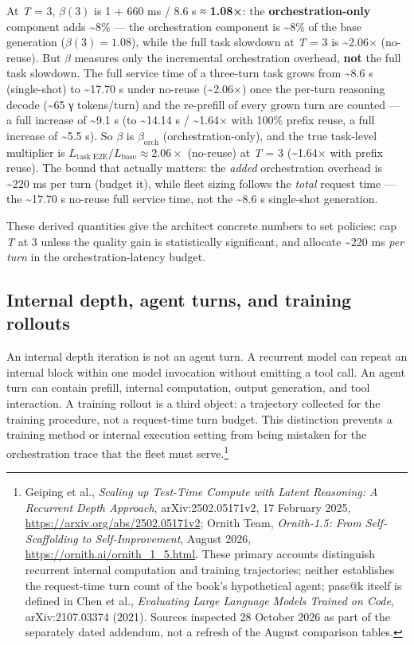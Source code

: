 At \emph{T} = 3, \(\beta(3)\) is 1 + 660 ms / 8.6 s ≈ \textbf{1.08×}:
the \textbf{orchestration-only} component adds \textasciitilde8\% ---
the orchestration component is \textasciitilde8\% of the base generation
(\(\beta(3) = 1.08\)), while the full task slowdown at \emph{T} = 3 is
\textasciitilde2.06× (no-reuse). But \(\beta\) measures only the
incremental orchestration overhead, \textbf{not} the full task slowdown.
The full service time of a three-turn task grows from \textasciitilde8.6
s (single-shot) to \textasciitilde17.70 s under no-reuse
(\textasciitilde2.06×) once the per-turn reasoning decode
(\textasciitilde65 γ tokens/turn) and the re-prefill of every grown turn
are counted --- a full increase of \textasciitilde9.1 s (to
\textasciitilde14.14 s / \textasciitilde1.64× with 100\% prefix reuse, a
full increase of \textasciitilde5.5 s). So \(\beta\) is
\(\beta_\text{orch}\) (orchestration-only), and the true task-level
multiplier is \(L_\text{task E2E}/L_\text{base} \approx 2.06×\)
(no-reuse) at \emph{T} = 3 (\textasciitilde1.64× with prefix reuse). The
bound that actually matters: the \emph{added} orchestration overhead is
\textasciitilde220 ms per turn (budget it), while fleet sizing follows
the \emph{total} request time --- the \textasciitilde17.70 s no-reuse
full service time, not the \textasciitilde8.6 s single-shot generation.

These derived quantities give the architect concrete numbers to set
policies: cap \emph{T} at 3 unless the quality gain is statistically
significant, and allocate \textasciitilde220 ms \emph{per turn} in the
orchestration-latency budget.

\subsection{Internal depth, agent turns, and training
rollouts}\label{internal-depth-agent-turns-and-training-rollouts}

An internal depth iteration is not an agent turn. A recurrent model can
repeat an internal block within one model invocation without emitting a
tool call. An agent turn can contain prefill, internal computation,
output generation, and tool interaction. A training rollout is a third
object: a trajectory collected for the training procedure, not a
request-time turn budget. This distinction prevents a training method or
internal execution setting from being mistaken for the orchestration
trace that the fleet must serve.\footnote{Geiping et al., \emph{Scaling
  up Test-Time Compute with Latent Reasoning: A Recurrent Depth
  Approach}, arXiv:2502.05171v2, 17 February 2025,
  \url{https://arxiv.org/abs/2502.05171v2}; Ornith Team,
  \emph{Ornith-1.5: From Self-Scaffolding to Self-Improvement}, August
  2026, \url{https://ornith.ai/ornith_1_5.html}. These primary accounts
  distinguish recurrent internal computation and training trajectories;
  neither establishes the request-time turn count of the book's
  hypothetical agent; pass@k itself is defined in Chen et al.,
  \emph{Evaluating Large Language Models Trained on Code},
  arXiv:2107.03374 (2021). Sources inspected 28 October 2026 as part of
  the separately dated addendum, not a refresh of the August comparison
  tables.}

